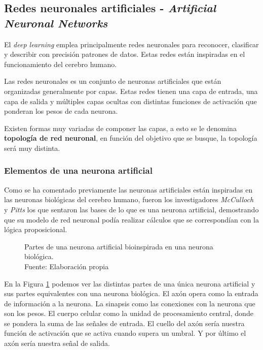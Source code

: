 \subsection{Redes neuronales artificiales - \textit{Artificial Neuronal Networks}}
El \textit{deep learning} emplea principalmente redes neuronales para reconocer, clasificar y describir con precisión patrones de datos. Estas redes están inspiradas en el funcionamiento del cerebro humano.  \cite{ibm-deep-learning}

Las redes neuronales es un conjunto de neuronas artificiales que están organizadas generalmente por capas. Estas redes tienen una capa de entrada, una capa de salida y múltiples capas ocultas con distintas funciones de activación que ponderan los pesos de cada neurona.

Existen formas muy variadas de componer las capas, a esto se le denomina \textbf{topología de red neuronal}, en función del objetivo que se busque, la topología será muy distinta.

\subsubsection{Elementos de una neurona artificial}

Como se ha comentado previamente las neuronas artificiales están inspiradas en las neuronas biológicas del cerebro humano, fueron los investigadores \textit{McCulloch} y \textit{Pitts} \cite{mcculloch1943logical} los que sentaron las bases de lo que es una neurona artificial, demostrando que su modelo de red neuronal podía realizar cálculos que se correspondían con la lógica proposicional.


\begin{figure}[H]
    \centering
    \centerline{}
    \caption{Partes de una neurona artificial bioinspirada en una neurona biológica.\\Fuente: Elaboración propia}
    \label{fig:artificial-neuron}
\end{figure}

En la Figura \ref{fig:artificial-neuron} podemos ver las distintas partes de una única neurona artificial y sus partes equivalentes con una neurona biológica. El axón opera como la entrada de información a la neurona. La sinapsis como las conexiones con la neurona que son los pesos. El cuerpo celular como la unidad de procesamiento central, donde se pondera la suma de las señales de entrada. El cuello del axón sería nuestra función de activación que se activa cuando supera un umbral. Y por último el axón sería nuestra señal de salida.



